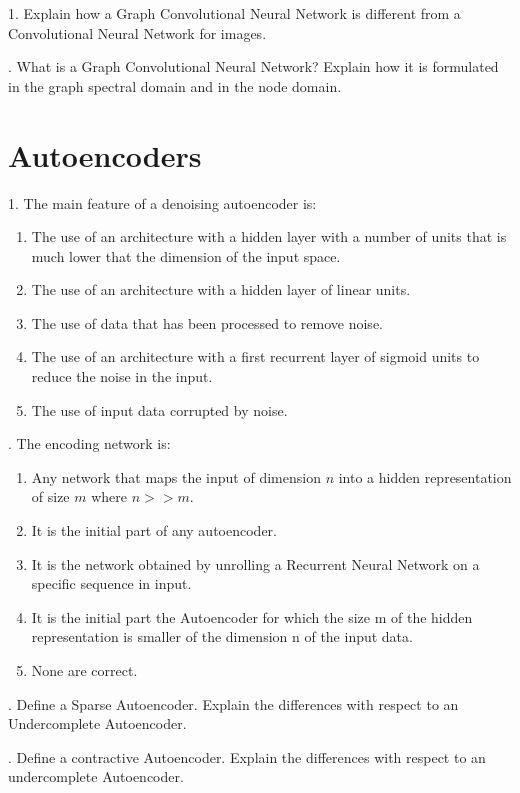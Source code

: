1. Explain how a Graph Convolutional Neural Network is different from a Convolutional Neural Network for images.

. What is a Graph Convolutional Neural Network? Explain how it is formulated in the graph spectral domain and in the node domain.

\section{ Autoencoders}

1. The main feature of a denoising autoencoder is:

\begin{enumerate}[label=\roman*]
    \item The use of an architecture with a hidden layer with a number of units that is much lower that the dimension of the input space.
    \item The use of an architecture with a hidden layer of linear units.
    \item The use of data that has been processed to remove noise.
    \item The use of an architecture with a first recurrent layer of sigmoid units to reduce the noise in the input.
    \item The use of input data corrupted by noise.
\end{enumerate}

. The encoding network is:

\begin{enumerate}[label=\roman*]
    \item Any network that maps the input of dimension $n$ into a hidden representation of size $m$ where $n >> m$.
    \item It is the initial part of any autoencoder.
    \item It is the network obtained by unrolling a Recurrent Neural Network on a specific sequence in input.
    \item It is the initial part the Autoencoder for which the size m of the hidden representation is smaller of the dimension n of the input data.
    \item None are correct.
\end{enumerate}

. Define a Sparse Autoencoder. Explain the differences with respect to an Undercomplete Autoencoder.

. Define a contractive Autoencoder. Explain the differences with respect to an undercomplete Autoencoder.

